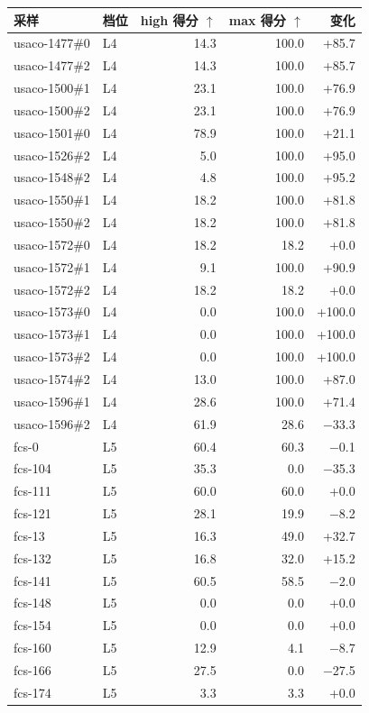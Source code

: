 \begin{longtable}{@{}llrrr@{}}
\toprule
采样 & 档位 & high 得分 $\uparrow$ & max 得分 $\uparrow$ & 变化 \\
\midrule\endhead
usaco-1477\#0 & L4 & 14.3 & 100.0 & +85.7 \\
usaco-1477\#2 & L4 & 14.3 & 100.0 & +85.7 \\
usaco-1500\#1 & L4 & 23.1 & 100.0 & +76.9 \\
usaco-1500\#2 & L4 & 23.1 & 100.0 & +76.9 \\
usaco-1501\#0 & L4 & 78.9 & 100.0 & +21.1 \\
usaco-1526\#2 & L4 & 5.0 & 100.0 & +95.0 \\
usaco-1548\#2 & L4 & 4.8 & 100.0 & +95.2 \\
usaco-1550\#1 & L4 & 18.2 & 100.0 & +81.8 \\
usaco-1550\#2 & L4 & 18.2 & 100.0 & +81.8 \\
usaco-1572\#0 & L4 & 18.2 & 18.2 & +0.0 \\
usaco-1572\#1 & L4 & 9.1 & 100.0 & +90.9 \\
usaco-1572\#2 & L4 & 18.2 & 18.2 & +0.0 \\
usaco-1573\#0 & L4 & 0.0 & 100.0 & +100.0 \\
usaco-1573\#1 & L4 & 0.0 & 100.0 & +100.0 \\
usaco-1573\#2 & L4 & 0.0 & 100.0 & +100.0 \\
usaco-1574\#2 & L4 & 13.0 & 100.0 & +87.0 \\
usaco-1596\#1 & L4 & 28.6 & 100.0 & +71.4 \\
usaco-1596\#2 & L4 & 61.9 & 28.6 & $-$33.3 \\
fcs-0 & L5 & 60.4 & 60.3 & $-$0.1 \\
fcs-104 & L5 & 35.3 & 0.0 & $-$35.3 \\
fcs-111 & L5 & 60.0 & 60.0 & +0.0 \\
fcs-121 & L5 & 28.1 & 19.9 & $-$8.2 \\
fcs-13 & L5 & 16.3 & 49.0 & +32.7 \\
fcs-132 & L5 & 16.8 & 32.0 & +15.2 \\
fcs-141 & L5 & 60.5 & 58.5 & $-$2.0 \\
fcs-148 & L5 & 0.0 & 0.0 & +0.0 \\
fcs-154 & L5 & 0.0 & 0.0 & +0.0 \\
fcs-160 & L5 & 12.9 & 4.1 & $-$8.7 \\
fcs-166 & L5 & 27.5 & 0.0 & $-$27.5 \\
fcs-174 & L5 & 3.3 & 3.3 & +0.0 \\

\end{longtable}
